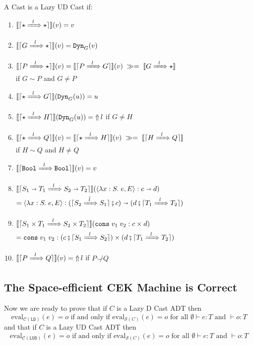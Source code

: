\documentclass[runningheads]{llncs}
\newcommand{\CMachine}[1]{\ensuremath{\mathcal{C}(#1)}}
\newcommand{\LDMachine}{\CMachine{\BLD}}
\newcommand{\LUDMachine}{\CMachine{\BLUD}}
\newcommand{\SMachine}[1]{\ensuremath{\mathcal{S}(#1)}}
\newcommand{\error}[1]{\ensuremath{\mathop{\Uparrow}#1}}
\newcommand{\Tdyn}[0]{\ensuremath{\star}}
\newcommand{\Pbool}[0]{\ensuremath{\mathtt{Bool}}}
\newcommand{\Pfunc}[2]{\ensuremath{#1 \shortrightarrow #2}}
\newcommand{\Pprod}[2]{\ensuremath{#1 \times #2}}
\newcommand{\elam}[3]{\lambda#1:#2.\;#3}
\newcommand{\econs}[2]{\mathtt{cons} \; #1 \; #2}
\newcommand{\ecast}[2]{\ensuremath{#1 : #2}}
\newcommand{\ccast}[3]{#1 \xRightarrow[]{\enskip #2 \enskip} #3}
\newcommand{\vdyn}[2]{\mathtt{Dyn}_{#1}(#2)}
\newcommand{\vfunc}[4]{\langle\elam{#1}{#2}{#3},#4\rangle}
\newcommand{\vcons}[2]{\econs{#1}{#2}}
\newcommand{\BLD}[0]{\ensuremath{\mathtt{LD}}}
\newcommand{\BLUD}[0]{\ensuremath{\mathtt{LUD}}}
\newcommand{\mbind}[0]{\ensuremath{\;\gg=\;}}
\newcommand{\denote}[1]{\ensuremath{\llbracket #1 \rrbracket}}
\newcommand{\compose}[2]{\ensuremath{#1 \fatsemi #2}}
\newcommand{\translate}[1]{\ensuremath{\lceil#1\rceil}}
\newcommand{\notshallowlyconsistent}[2]{\ensuremath{#1\not\smile#2}}
\newcommand{\expressiontyping}[3]{\ensuremath{#1 \vdash #2 : #3}}
\newcommand{\valuetyping}[2]{\ensuremath{\vdash #1 : #2}}
\newcommand{\withmachineevalto}[3]{\ensuremath{\mathrm{eval}_{#1}(#2)=#3}}
\newcommand{\machineequiv}[2]{
	\ensuremath{
		\withmachineevalto{#1}{e}{o}	
		\text{ if and only if }
		\withmachineevalto{#2}{e}{o}
		\text{ for all }
		\expressiontyping{\emptyset}{e}{T}
		\text{ and }
		\valuetyping{o}{T}
	}}
\begin{document}
\begin{definition}
	\label{def:LazyUD-CastADT}
	A Cast is a Lazy UD Cast if:
	\begin{enumerate}
	\item $\denote{\translate{\ccast{\Tdyn}{l}{\Tdyn}}}(v) = v$
	\item $\denote{\translate{\ccast{G}{l}{\Tdyn}}}(v) = \vdyn{G}{v}$
	\item $\denote{\translate{\ccast{P}{l}{\Tdyn}}}(v) = 
		\denote{\translate{\ccast{P}{l}{G}}}(v) \mbind 
		\denote{\ccast{G}{l}{\Tdyn}}$\\
		if $G \sim P$ and $G \neq P$	
	\item $\denote{\translate{\ccast{\Tdyn}{l}{G}}}(\vdyn{G}{u}) = u$
	\item $\denote{\translate{\ccast{\Tdyn}{l}{H}}}(\vdyn{G}{u}) = \error{l}$ \qquad
		if $G \neq H$
	\item $\denote{\translate{\ccast{\Tdyn}{l}{Q}}}(v) = 
		\denote{\translate{\ccast{\Tdyn}{l}{H}}}(v) \mbind
		\denote{\translate{\ccast{H}{l}{Q}}}$\\
		if $H \sim Q$ and $H \neq Q$
	\item $\denote{\translate{\ccast{\Pbool}{l}{\Pbool}}}(v) = v$
		\item 
		$\denote{\translate{\ccast{\Pfunc{S_1}{T_1}}{l}{\Pfunc{S_2}{T_2}}}}(
		\ecast{\vfunc{x}{S}{e}{E}}{\Pfunc{c}{d}})$\\
		$=
		\ecast{\vfunc{x}{S}{e}{E}}{
			\Pfunc{
				(\compose{\translate{\ccast{S_2}{\bar{l}}{S_1}}}{c})}{
				(\compose{d}{\translate{\ccast{T_1}{l}{T_2}}})}}$
		\item 
		$\denote{\translate{\ccast{\Pprod{S_1}{T_1}}{l}{\Pprod{S_2}{T_2}}}}(
		\ecast{\vcons{v_1}{v_2}}{\Pprod{c}{d}})$\\
		$=
		\ecast{\vcons{v_1}{v_2}}{
			\Pprod{
				(\compose{c}{\translate{\ccast{S_1}{l}{S_2}}})}{
				(\compose{d}{\translate{\ccast{T_1}{l}{T_2}}})}}$
		\item $\denote{\translate{\ccast{P}{l}{Q}}}(v) = \error{l}$\qquad
			if $\notshallowlyconsistent{P}{Q}$
	\end{enumerate}
\end{definition}

\subsection{The Space-efficient CEK Machine is Correct}
\label{sec:S-correct}

Now we are ready to prove that if $C$ is a Lazy D Cast ADT then
\[
\machineequiv{\LDMachine}{\SMachine{C}}
\]
and that if $C$ is a Lazy UD Cast ADT then
\[
\machineequiv{\LUDMachine}{\SMachine{C}}
\]
\end{document}
